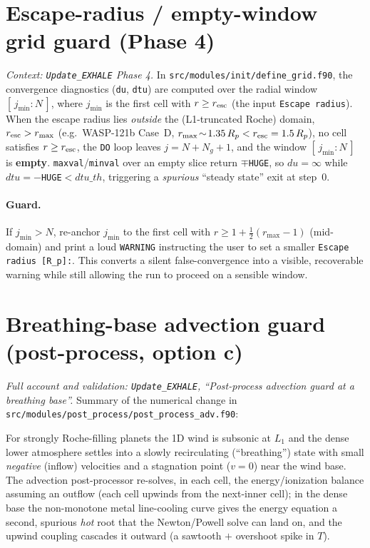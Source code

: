 \documentclass[english,a4paper]{my_memo}
\begin{document}
\section{Escape-radius / empty-window grid guard (Phase 4)}\label{sec:grid}
\emph{Context: \texttt{Update\_EXHALE} Phase 4.} In
\texttt{src/modules/init/define\_grid.f90}, the convergence diagnostics
(\texttt{du}, \texttt{dtu}) are computed over the radial window
$[\,j_{\min}:N\,]$, where $j_{\min}$ is the first cell with $r\ge r_{\rm esc}$
(the input \texttt{Escape radius}). When the escape radius lies \emph{outside} the
(L1-truncated Roche) domain, $r_{\rm esc}>r_{\max}$ (e.g.\ WASP-121b Case~D,
$r_{\max}\!\sim\!1.35\,R_p < r_{\rm esc}=1.5\,R_p$), no cell satisfies
$r\ge r_{\rm esc}$, the \texttt{DO} loop leaves $j=N+N_g+1$, and the window
$[\,j_{\min}:N\,]$ is \textbf{empty}. \texttt{maxval}/\texttt{minval} over an empty
slice return $\mp$\texttt{HUGE}, so $du=\infty$ while $dtu=-$\texttt{HUGE}$<dtu\_th$,
triggering a \emph{spurious} ``steady state'' exit at step~0.

\paragraph{Guard.} If $j_{\min}>N$, re-anchor $j_{\min}$ to the first cell with
$r\ge 1+\tfrac12(r_{\max}-1)$ (mid-domain) and print a loud \texttt{WARNING}
instructing the user to set a smaller \texttt{Escape radius [R\_p]:}. This converts
a silent false-convergence into a visible, recoverable warning while still allowing
the run to proceed on a sensible window.

\section{Breathing-base advection guard (post-process, option c)}\label{sec:breath}
\emph{Full account and validation: \texttt{Update\_EXHALE}, ``Post-process advection
guard at a breathing base''.} Summary of the numerical change in
\texttt{src/modules/post\_process/post\_process\_adv.f90}:

For strongly Roche-filling planets the 1D wind is subsonic at $L_1$ and the dense
lower atmosphere settles into a slowly recirculating (``breathing'') state with
small \emph{negative} (inflow) velocities and a stagnation point ($v=0$) near the
wind base. The advection post-processor re-solves, in each cell, the energy/ionization
balance assuming an outflow (each cell upwinds from the next-inner cell); in the
dense base the non-monotone metal line-cooling curve gives the energy equation a
second, spurious \emph{hot} root that the Newton/Powell solve can land on, and the
upwind coupling cascades it outward (a sawtooth $+$ overshoot spike in $T$).
\end{document}
